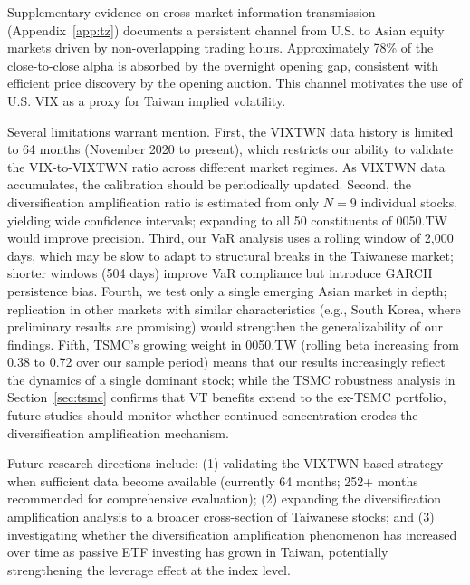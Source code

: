 Supplementary evidence on cross-market information transmission (Appendix~\ref{app:tz}) documents a persistent channel from U.S. to Asian equity markets driven by non-overlapping trading hours. Approximately 78\% of the close-to-close alpha is absorbed by the overnight opening gap, consistent with efficient price discovery by the opening auction. This channel motivates the use of U.S. VIX as a proxy for Taiwan implied volatility.

Several limitations warrant mention. First, the VIXTWN data history is limited to 64 months (November 2020 to present), which restricts our ability to validate the VIX-to-VIXTWN ratio across different market regimes. As VIXTWN data accumulates, the calibration should be periodically updated. Second, the diversification amplification ratio is estimated from only $N = 9$ individual stocks, yielding wide confidence intervals; expanding to all 50 constituents of 0050.TW would improve precision. Third, our VaR analysis uses a rolling window of 2,000 days, which may be slow to adapt to structural breaks in the Taiwanese market; shorter windows (504 days) improve VaR compliance but introduce GARCH persistence bias. Fourth, we test only a single emerging Asian market in depth; replication in other markets with similar characteristics (e.g., South Korea, where preliminary results are promising) would strengthen the generalizability of our findings. Fifth, TSMC's growing weight in 0050.TW (rolling beta increasing from 0.38 to 0.72 over our sample period) means that our results increasingly reflect the dynamics of a single dominant stock; while the TSMC robustness analysis in Section~\ref{sec:tsmc} confirms that VT benefits extend to the ex-TSMC portfolio, future studies should monitor whether continued concentration erodes the diversification amplification mechanism.

Future research directions include: (1) validating the VIXTWN-based strategy when sufficient data become available (currently 64 months; 252+ months recommended for comprehensive evaluation); (2) expanding the diversification amplification analysis to a broader cross-section of Taiwanese stocks; and (3) investigating whether the diversification amplification phenomenon has increased over time as passive ETF investing has grown in Taiwan, potentially strengthening the leverage effect at the index level.




